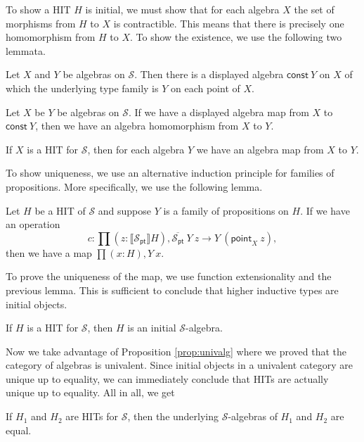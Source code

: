\documentclass[9pt]{entcs}
\newcommand{\function}[1]{\mathsf{#1}}
\newcommand{\deprod}[3]{\prod(#1 : #2), #3} %
\newcommand{\0}{\textbf{0}} %
\newcommand{\pt}[0]{\textsf{pt}}
\newcommand{\pointc}[1]{#1_{\pt}} %
\newcommand{\sig}{\mathcal{S}} %
\newcommand{\semP}[1]{\llbracket #1 \rrbracket} %
\newcommand{\constrA}[1]{\function{point}_{#1}} %
\newcommand{\polydact}[2]{\overline{#1} \> #2} %
\newcommand{\constdisp}{\function{const}} %
\begin{document}
To show a HIT $H$ is initial, we must show that for each algebra $X$ the set of morphisms from $H$ to $X$ is contractible.
This means that there is precisely one homomorphism from $H$ to $X$.
To show the existence, we use the following two lemmata.

\begin{lemma}
Let $X$ and $Y$ be algebras on $\sig$.
Then there is a displayed algebra $\constdisp \> Y$ on $X$ of which the underlying type family is $Y$ on each point of $X$.
\end{lemma}

\begin{lemma}
Let $X$ be $Y$ be algebras on $\sig$.
If we have a displayed algebra map from $X$ to $\constdisp \> Y$, then we have an algebra homomorphism from $X$ to $Y$.
\end{lemma}

\begin{corollary}
If $X$ is a HIT for $\sig$, then for each algebra $Y$ we have an algebra map from $X$ to $Y$.
\end{corollary}

To show uniqueness, we use an alternative induction principle for families of propositions.
More specifically, we use the following lemma.

\begin{lemma}
Let $H$ be a HIT of $\sig$ and suppose $Y$ is a family of propositions on $H$.
If we have an operation
\[
c : \deprod{z}{\semP{\pointc{\sig}}{H}}{\polydact{\pointc{\sig}}{Y} \> z \rightarrow Y \> (\constrA{X} \> z)},
\]
then we have a map $\deprod{x}{H}{Y \> x}$.
\end{lemma}

To prove the uniqueness of the map, we use function extensionality and the previous lemma.
This is sufficient to conclude that higher inductive types are initial objects.

\begin{proposition}
If $H$ is a HIT for $\sig$, then $H$ is an initial $\sig$-algebra.
\end{proposition}

Now we take advantage of Proposition \ref{prop:univalg} where we proved that the category of algebras is univalent.
Since initial objects in a univalent category are unique up to equality, we can immediately conclude that HITs are actually unique up to equality.
All in all, we get

\begin{corollary}
\label{cor:hit_unique}
If $H_1$ and $H_2$ are HITs for $\sig$, then the underlying $\sig$-algebras of $H_1$ and $H_2$ are equal.
\end{corollary}
\end{document}
